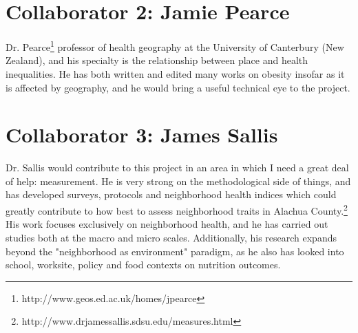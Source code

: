 \documentclass[11pt]{article}
\begin{document}
\section*{Collaborator 2: Jamie Pearce}
Dr. Pearce\footnote{http://www.geos.ed.ac.uk/homes/jpearce} professor of health geography at the University of Canterbury (New Zealand), and his specialty is the relationship between place and health inequalities.  He has both written and edited\cite{Pearce2010} many works on obesity insofar as it is affected by geography, and he would bring a useful technical eye to the project.

\section*{Collaborator 3: James Sallis}
Dr. Sallis would contribute to this project in an area in which I need a great deal of help: measurement.  He is very strong on the methodological side of things, and has developed surveys, protocols and neighborhood health indices which could greatly contribute to how best to assess neighborhood traits in Alachua County.\footnote{http://www.drjamessallis.sdsu.edu/measures.html}  His work focuses exclusively on neighborhood health\cite{Sallis2012}, and he has carried out studies both at the macro\cite{Sallis2009} and micro\cite{Sallis2010} scales.  Additionally, his research expands beyond the "neighborhood as environment" paradigm, as he also has looked into school, worksite, policy and food contexts on nutrition outcomes. \cite{Sallis2009}  

\hrulefill


\newpage


\end{document}
